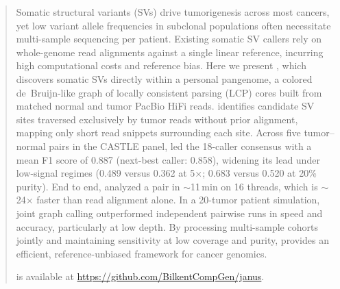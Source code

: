 \begin{abstract}

Somatic structural variants (SVs) drive tumorigenesis across most cancers, yet low variant allele frequencies in subclonal populations often necessitate multi-sample sequencing per patient. Existing somatic SV callers rely on whole-genome read alignments against a single linear reference, incurring high computational costs and reference bias. Here we present \tool, which discovers somatic SVs directly within a personal pangenome, a colored de~Bruijn-like graph of locally consistent parsing (LCP) cores built from matched normal and tumor PacBio HiFi reads. \tool identifies candidate SV sites traversed exclusively by tumor reads without prior alignment, mapping only short read snippets surrounding each site. Across five tumor--normal pairs in the CASTLE panel, \tool led the 18-caller consensus with a mean F1 score of 0.887 (next-best caller: 0.858), widening its lead under low-signal regimes (0.489 versus 0.362 at 5$\times$; 0.683 versus 0.520 at 20\% purity). End to end, \tool analyzed a pair in $\sim$11\,min on 16 threads, which is $\sim$24$\times$ faster than read alignment alone. In a 20-tumor patient simulation, joint graph calling outperformed independent pairwise runs in speed and accuracy, particularly at low depth. By processing multi-sample cohorts jointly and maintaining sensitivity at low coverage and purity, \tool provides an efficient, reference-unbiased framework for cancer genomics.

\tool is available at \url{https://github.com/BilkentCompGen/janus}.
\end{abstract}
